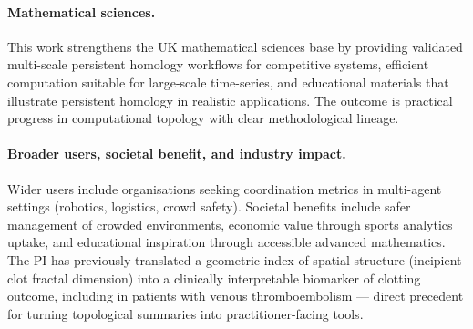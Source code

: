 \paragraph{Mathematical sciences.}
This work strengthens the UK mathematical sciences base by providing validated multi-scale persistent homology workflows for competitive systems, efficient computation suitable for large-scale time-series, and educational materials that illustrate persistent homology in realistic applications. The outcome is practical progress in computational topology with clear methodological lineage.

\paragraph{Broader users, societal benefit, and industry impact.}
Wider users include organisations seeking coordination metrics in multi-agent settings (robotics, logistics, crowd safety). Societal benefits include safer management of crowded environments, economic value through sports analytics uptake, and educational inspiration through accessible advanced mathematics. The PI has previously translated a geometric index of spatial structure (incipient-clot fractal dimension) into a clinically interpretable biomarker of clotting outcome, including in patients with venous thromboembolism --- direct precedent for turning topological summaries into practitioner-facing tools.
